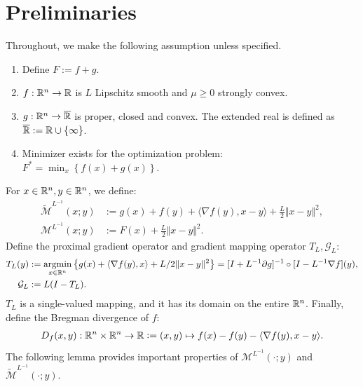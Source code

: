 \documentclass[12pt]{article}
\begin{document}
\section{Preliminaries}\label{sec:preliminaries}
    Throughout, we make the following assumption unless specified.
    \begin{assumption}\label{ass:smooth-nsmooth-additive}
        \;
        \begin{enumerate}
            \item Define $F := f + g$.
            \item $f: \mathbb R^n \rightarrow \mathbb R$ is $L$ Lipschitz smooth and $\mu \ge 0$ strongly convex.
            \item $g: \mathbb R^n \rightarrow \overline {\mathbb R}$ is proper, closed and convex. The extended real is defined as $\overline {\mathbb R} := \mathbb R \cup \{\infty\}$.
            \item Minimizer exists for the optimization problem: $F^* = \min_x \left\lbrace f(x) + g(x)\right\rbrace$.
        \end{enumerate}
    \end{assumption}
    For $x \in \mathbb R^n, y \in \mathbb R^n$, we define:
    \begin{align}
        \widetilde{\mathcal M}^{L^{-1}}
        (x; y)
        &:=
        g(x) + f(y) + \langle \nabla f(y), x - y\rangle
        + \frac{L}{2}\Vert x - y\Vert^2,  \label{eqn:pg-model-func}
        \\
        \mathcal M^{L^{-1}}(x; y) &:= F(x) + \frac{L}{2}\Vert x - y\Vert^2.
        \label{eqn:pp-model-func}
    \end{align}
    Define the proximal gradient operator and gradient mapping operator $T_L, \mathcal G_L$:
    \begin{align*}
        T_L(y) &:= \mathop{\rm argmin}\limits_{x \in \mathbb R^n} \left\lbrace
            g(x) + \langle \nabla f(y), x\rangle + L/2\Vert x - y\Vert^2
        \right\rbrace = [I + L^{-1}\partial g]^{-1}\circ [I - L^{-1}\nabla f](y),
        \\
        \mathcal G_L
        &:= L(I - T_L).
    \end{align*}
    $T_L$ is a single-valued mapping, and it has its domain on the entire $\mathbb R^n$.
    Finally, define the Bregman divergence of $f$:
    \begin{align*}
        D_f(x, y): \mathbb R^n \times \mathbb R^n \rightarrow \mathbb R
        \vcentcolon= (x, y)\mapsto f(x) - f(y) - \langle \nabla f(y), x - y\rangle.
    \end{align*}
    The following lemma provides important properties of $\mathcal M^{L^{-1}}(\cdot; y)$ and $ \widetilde{\mathcal M}^{L^{-1}}(\cdot; y)$.
\end{document}
